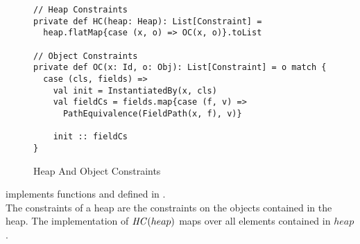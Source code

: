 %
\newpage
\begin{figure}[h]
\begin{lstlisting}
// Heap Constraints
private def HC(heap: Heap): List[Constraint] =
  heap.flatMap{case (x, o) => OC(x, o)}.toList

// Object Constraints
private def OC(x: Id, o: Obj): List[Constraint] = o match {
  case (cls, fields) =>
    val init = InstantiatedBy(x, cls)
    val fieldCs = fields.map{case (f, v) =>
      PathEquivalence(FieldPath(x, f), v)}

    init :: fieldCs
}
\end{lstlisting}
\caption{Heap And Object Constraints}
\label{fig:scala-heapconstr}
\end{figure}
%
 implements functions  and 
defined in .
\\
The constraints of a heap are the constraints
on the objects contained in the heap.
The implementation of $\mathit{HC}(heap)$ maps  over
all elements contained in $heap$.

